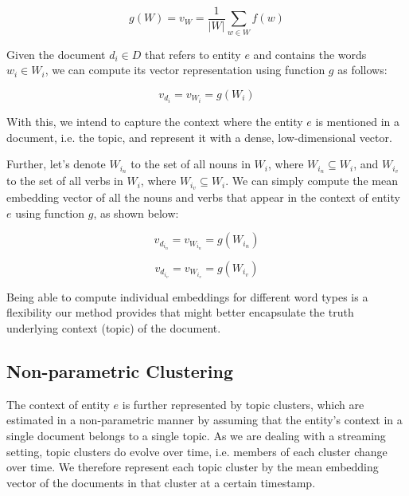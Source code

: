 \documentclass{article}
\begin{document}
\begin{equation}
\label{wordembedding}
g(W) = v_W = \frac{1}{|W|} \sum_{w \in W}{f(w)}
\end{equation}

Given the document $d_i \in D$ that refers to entity $e$ and contains the words $w_i \in W_i$, we can compute its vector representation using function $g$ as follows:

\begin{equation}
\label{wordembedding1}
v_{d_i} = v_{W_i} = g(W_i)
\end{equation}

With this, we intend to capture the context where the entity $e$ is mentioned in a document, i.e. the topic, and represent it with a dense, low-dimensional vector.

Further, let's denote $W_{i_n}$ to the set of all nouns in $W_i$, where $W_{i_n} \subseteq W_i$, and $W_{i_v}$ to the set of all verbs in $W_i$, where $W_{i_v} \subseteq W_i$. We can simply compute the mean embedding vector of all the nouns and verbs that appear in the context of entity $e$ using function $g$, as shown below:

\begin{equation*}
\label{nouns}
v_{d_{i_n}} = v_{W_{i_n}} = g(W_{i_n})
\end{equation*}

\begin{equation*}
\label{verbs}
v_{d_{i_v}} = v_{W_{i_v}} = g(W_{i_v})
\end{equation*}

Being able to compute individual embeddings for different word types is a flexibility our method provides that might better encapsulate the truth underlying context (topic) of the document.

\subsection{Non-parametric Clustering}
\label{non}

The context of entity $e$ is further represented by topic clusters, which are estimated in a non-parametric manner by assuming that the entity's context in a single document belongs to a single topic. As we are dealing with a streaming setting, topic clusters do evolve over time, i.e. members of each cluster change over time. We therefore represent each topic cluster by the mean embedding vector of the documents in that cluster at a certain timestamp.
\end{document}
